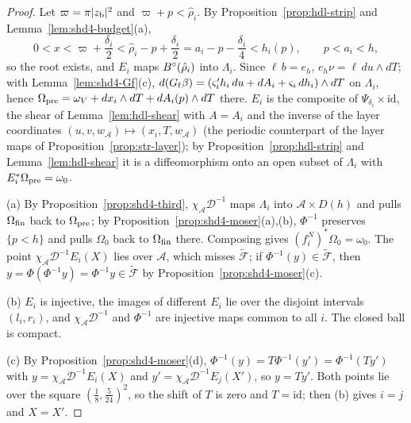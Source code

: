 \begin{proof}
Let $\varpi=\pi|z_{\rm b}|^2$ and $\varpi+p<\hat\rho_i$. By Proposition~\ref{prop:hdl-strip} and Lemma~\ref{lem:shd4-budget}(a),
\[
 0<x<\varpi+\frac{\delta_i}2<\hat\rho_i-p+\frac{\delta_i}2=a_i-p-\frac{\delta_i}4<h_i(p),\qquad p<a_i<h,
\]
so the root exists, and $E_i$ maps $B^{\circ}(\hat\rho_i)$ into $\Lambda_i$. Since $\ell\,b=e_h$, $e_h\nu=\ell\,du\wedge dT$; with
Lemma~\ref{lem:shd4-Gf}(c), $d(G_{\rm f}\beta)=(\varsigma_i'h_i\,du+dA_i+\varsigma_i\,dh_i)\wedge dT$ on $\Lambda_i$, hence
$\Omega_{\rm pre}=\omega_V+dx_i\wedge dT+dA_i(p)\wedge dT$ there. $E_i$ is the composite
of $\Psi_{\delta_i}\times\mathrm{id}$, the shear of Lemma~\ref{lem:hdl-shear} with $A=A_i$ and the inverse of the layer coordinates
$(u,v,w_{\mathcal A})\mapsto(x_i,T,w_{\mathcal A})$ (the periodic counterpart of the layer maps of Proposition~\ref{prop:str-layer}); by Proposition~\ref{prop:hdl-strip} and Lemma~\ref{lem:hdl-shear} it is a diffeomorphism onto an open subset of $\Lambda_i$ with $E_i^*\Omega_{\rm pre}=\omega_0$.

(a) By Proposition~\ref{prop:shd4-third}, $\chi_{\mathcal A}\mathcal D^{-1}$ maps $\Lambda_i$ into $\mathcal A\times D(h)$ and pulls $\Omega_{\rm fin}$ back
to $\Omega_{\rm pre}$; by Proposition~\ref{prop:shd4-moser}(a),(b), $\Phi^{-1}$ preserves $\{p<h\}$ and pulls $\Omega_0$ back to
$\Omega_{\rm fin}$ there. Composing gives $(f^N_i)^*\Omega_0=\omega_0$. The point $\chi_{\mathcal A}\mathcal D^{-1}E_i(X)$ lies over $\mathcal A$,
which misses $\widetilde{\mathcal F}$; if $\Phi^{-1}(y)\in\widetilde{\mathcal F}$, then $y=\Phi(\Phi^{-1}y)=\Phi^{-1}y\in\widetilde{\mathcal F}$ by
Proposition~\ref{prop:shd4-moser}(c).

(b) $E_i$ is injective, the images of different $E_i$ lie over the disjoint intervals $(l_i,r_i)$, and
$\chi_{\mathcal A}\mathcal D^{-1}$ and $\Phi^{-1}$ are injective maps common to all $i$. The closed ball is compact.

(c) By Proposition~\ref{prop:shd4-moser}(d), $\Phi^{-1}(y)=T\Phi^{-1}(y')=\Phi^{-1}(Ty')$ with $y=\chi_{\mathcal A}\mathcal D^{-1}E_i(X)$ and
$y'=\chi_{\mathcal A}\mathcal D^{-1}E_j(X')$, so $y=Ty'$. Both points lie over the square $(\frac18,\frac5{24})^2$, so the shift of $T$ is
zero and $T=\mathrm{id}$; then (b) gives $i=j$ and $X=X'$.
\end{proof}

